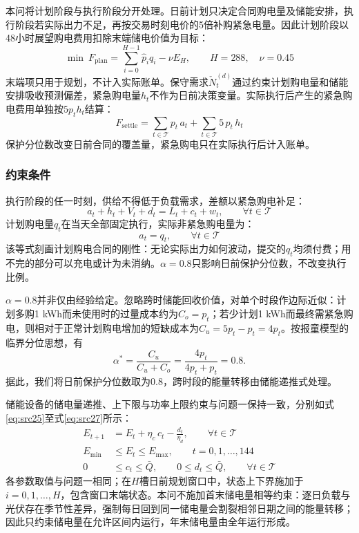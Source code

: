 本问将计划阶段与执行阶段分开处理。日前计划只决定合同购电量及储能安排，执行阶段若实际出力不足，再按交易时刻电价的5倍补购紧急电量。因此计划阶段以48小时展望购电费用扣除末端储电价值为目标：
\begin{equation}\label{eq:src21}
    \min\ F_{\mathrm{plan}}=\sum_{i=0}^{H-1}\hat p_iq_i-\nu E_H,\qquad H=288,\quad\nu=0.45
\end{equation}
末端项只用于规划，不计入实际账单。保守需求$\check{N}_t^{(d)}$通过约束计划购电量和储能安排吸收预测偏差，紧急购电量$h_t$不作为日前决策变量。实际执行后产生的紧急购电费用单独按$5p_t h_t$结算：
\begin{equation}\label{eq:src22}
    F_{\mathrm{settle}}=\sum_{t\in\mathcal{T}} p_{t}\,a_{t}+\sum_{t\in\mathcal{T}}5\,p_{t}\,h_{t}
\end{equation}
保护分位数改变日前合同的覆盖量，紧急购电只在实际执行后计入账单。

\subsubsection{约束条件}

执行阶段的任一时刻，供给不得低于负载需求，差额以紧急购电补足：
\begin{equation}\label{eq:src23}
    a_{t}+h_{t}+V_{t}+d_{t}=L_{t}+c_{t}+w_{t},\qquad \forall t\in\mathcal{T}
\end{equation}
计划购电量$q_t$在当天全部固定执行，实际非紧急购电量为：
\begin{equation}\label{eq:src24}
    a_t=q_t,\qquad \forall t\in\mathcal T
\end{equation}
该等式刻画计划购电合同的刚性：无论实际出力如何波动，提交的$q_t$均须付费；用不完的部分可以充电或计为未消纳。$\alpha=0.8$只影响日前保护分位数，不改变执行比例。

$\alpha=0.8$并非仅由经验给定。忽略跨时储能回收价值，对单个时段作边际近似：计划多购1 kWh而未使用时的过量成本约为$C_o=p_t$；若少计划1 kWh而最终需紧急购电，则相对于正常计划购电增加的短缺成本为$C_u=5p_t-p_t=4p_t$。按报童模型的临界分位思想，有
\begin{equation}\label{eq:q2_quantile}
\alpha^*=\frac{C_u}{C_u+C_o}=\frac{4p_t}{4p_t+p_t}=0.8.
\end{equation}
据此，我们将日前保护分位数取为0.8，跨时段的能量转移由储能递推式处理。


储能设备的储电量递推、上下限与功率上限约束与问题一保持一致，分别如式\eqref{eq:src25}至式\eqref{eq:src27}所示：
\begin{align}
    E_{t+1}&=E_{t}+\eta_{c}\,c_{t}-\frac{d_{t}}{\eta_{d}},\qquad \forall t\in\mathcal{T}\label{eq:src25}\\
    E_{\min}&\le E_{t}\le E_{\max},\qquad t=0,1,\ldots,144\label{eq:src26}\\
    0&\le c_{t}\le \bar{Q},\qquad 0\le d_{t}\le \bar{Q},\qquad \forall t\in\mathcal{T}
\label{eq:src27}\end{align}
各参数取值与问题一相同；在$H$槽日前规划窗口中，状态上下界施加于$i=0,1,\ldots,H$，包含窗口末端状态。本问不施加首末储电量相等约束：逐日负载与光伏存在季节性差异，强制每日回到同一储电量会割裂相邻日期之间的能量转移；因此只约束储电量在允许区间内运行，年末储电量由全年运行形成。


